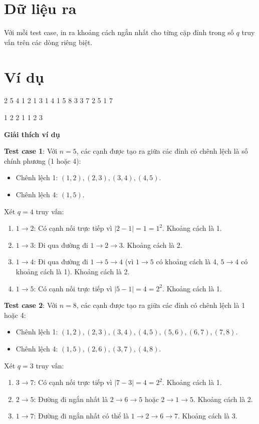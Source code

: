 \documentclass[12pt,a4paper]{article}
\newcommand{\explanation}{%
  \vspace{6pt}\textbf{\textcolor{sectioncolor}{Giải thích ví dụ}}\par\vspace{2pt}%
}
\begin{document}
\section*{Dữ liệu ra}
Với mỗi test case, in ra khoảng cách ngắn nhất cho từng cặp đỉnh trong số $q$ truy vấn trên các dòng riêng biệt.

\section*{Ví dụ}
\begin{inputbox}
2
5 4
1 2
1 3
1 4
1 5
8 3
3 7
2 5
1 7
\end{inputbox}
\begin{outputbox}
1
2
2
1
1
2
3
\end{outputbox}

\explanation

\textbf{Test case 1}: Với $n = 5$, các cạnh được tạo ra giữa các đỉnh có chênh lệch là số chính phương (1 hoặc 4):
\begin{itemize}
    \item Chênh lệch 1: $(1, 2), (2, 3), (3, 4), (4, 5)$.
    \item Chênh lệch 4: $(1, 5)$.
\end{itemize}
Xét $q=4$ truy vấn:
\begin{enumerate}
    \item $1 \to 2$: Có cạnh nối trực tiếp vì $|2 - 1| = 1 = 1^2$. Khoảng cách là 1.
    \item $1 \to 3$: Đi qua đường đi $1 \to 2 \to 3$. Khoảng cách là 2.
    \item $1 \to 4$: Đi qua đường đi $1 \to 5 \to 4$ (vì $1 \to 5$ có khoảng cách là 4, $5 \to 4$ có khoảng cách là 1). Khoảng cách là 2.
    \item $1 \to 5$: Có cạnh nối trực tiếp vì $|5 - 1| = 4 = 2^2$. Khoảng cách là 1.
\end{enumerate}

\textbf{Test case 2}: Với $n = 8$, các cạnh được tạo ra giữa các đỉnh có chênh lệch là 1 hoặc 4:
\begin{itemize}
    \item Chênh lệch 1: $(1, 2), (2, 3), (3, 4), (4, 5), (5, 6), (6, 7), (7, 8)$.
    \item Chênh lệch 4: $(1, 5), (2, 6), (3, 7), (4, 8)$.
\end{itemize}
Xét $q=3$ truy vấn:
\begin{enumerate}
    \item $3 \to 7$: Có cạnh nối trực tiếp vì $|7 - 3| = 4 = 2^2$. Khoảng cách là 1.
    \item $2 \to 5$: Đường đi ngắn nhất là $2 \to 6 \to 5$ hoặc $2 \to 1 \to 5$. Khoảng cách là 2.
    \item $1 \to 7$: Đường đi ngắn nhất có thể là $1 \to 2 \to 6 \to 7$. Khoảng cách là 3.
\end{enumerate}

\newpage
\end{document}
